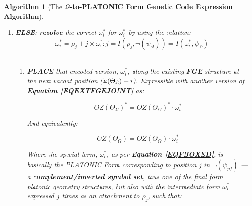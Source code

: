 \documentclass[a4paper, 18pt]{book} %
\newtheorem{alg}{Algorithm}
\newcommand{\invpi}{\rotatebox[origin=c]{180}{$\pi$}}
\begin{document}
\begin{appendices}
\begin{alg}[The \textbf{$\Omega$-to-PLATONIC Form Genetic Code Expression Algorithm}]
\begin{enumerate}
{\begin{enumerate}
{\begin{enumerate}
{\begin{enumerate}
{		And equivalently:
		
		\begin{equation}
		\label{EQEXTFGEJOINTSUF_ORIG}
		\boxed{OZ(\Theta_\Omega)} = \boxed{OZ(\Theta_\Omega)} \cdot \boxed{\omega_i^*}_{joint}
		\end{equation}				
		
		}
		\item \textbf{PROCEED} to the next symbol in \textbf{IFA MSS}, $\overset{>}{OZ(\Theta_\Omega)}$\\ (loop from \textbf{Step\#2(c))}.
		\end{enumerate}
	}
	\item { \textbf{ELSE}: \textbf{resolve} the correct  $\boxed{\omega_i^*}$  for  $\omega_i^*$  by using the relation:\\

\begin{equation}
\label{EQFBOXED_ORIG}
 \boxed{\omega_i^*} = \rho_j +  j \times \omega_i^* : j = I(\rho_j,\lnot(\psi_{pl})) = I(\omega_i^*,\psi_\Omega)
\end{equation}\\

	\begin{enumerate}
	\item{\textbf{PLACE} that encoded version, $\boxed{\omega_i^*}$, along the existing \textbf{FGE} structure at the next vacant position ($\invpi(\Theta_\Omega)+i$). Expressible with another version of \textbf{Equation \ref{EQEXTFGEJOINT}} as:
	
	\begin{equation}
	\label{EQEXTFGEPF_ORIG}
		\boxed{OZ(\Theta_\Omega)}^* = \boxed{OZ(\Theta_\Omega)}^* \cdot \boxed{\omega_i^*}
		\end{equation}	
		
		And equivalently:
		
		\begin{equation}
		\label{EQEXTFGEPFSUF_ORIG}
		\boxed{OZ(\Theta_\Omega)} = \boxed{OZ(\Theta_\Omega)} \cdot \boxed{\omega_i^*}
		\end{equation}	
		
	Where the special term, $\boxed{\omega_i^*}$, as per \textbf{Equation \ref{EQFBOXED}}, is basically the PLATONIC Form corresponding to position $j$ in $\lnot(\psi_{pf})$ --- a \textbf{complement/inverted symbol set}, thus one of the final form platonic geometry structures, but also with the intermediate form $\omega_i^*$ expressed $j$ times as an attachment to $\rho_j$, such that:\\
	
}
\end{enumerate}}
\end{enumerate}}
\end{enumerate}}
\end{enumerate}
\end{alg}
\end{appendices}
\end{document}
